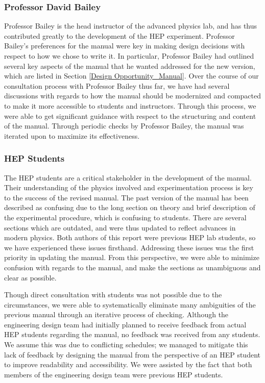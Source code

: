 \documentclass[12pt]{article} %
\begin{document}
\subsubsection{Professor David Bailey}
Professor Bailey is the head instructor of the advanced physics lab, and has thus contributed greatly to the development of the HEP experiment. Professor Bailey's preferences for the manual were key in making design decisions with respect to how we chose to write it. In particular, Professor Bailey had outlined several key aspects of the manual that he wanted addressed for the new version, which are listed in Section \ref{Design Opportunity_Manual}. Over the course of our consultation process with Professor Bailey thus far, we have had several discussions with regards to how the manual should be modernized and compacted to make it more accessible to students and instructors. Through this process, we were able to get significant guidance with respect to the structuring and content of the manual. Through periodic checks by Professor Bailey, the manual was iterated upon to maximize its effectiveness.

\subsubsection{HEP Students}
The HEP students are a critical stakeholder in the development of the manual. Their understanding of the physics involved and experimentation process is key to the success of the revised manual. The past version of the manual has been described as confusing due to the long section on theory and brief description of the experimental procedure, which is confusing to students. There are several sections which are outdated, and were thus updated to reflect advances in modern physics. Both authors of this report were previous HEP lab students, so we have experienced these issues firsthand. Addressing these issues was the first priority in updating the manual. From this perspective, we were able to minimize confusion with regards to the manual, and make the sections as unambiguous and clear as possible. 

Though direct consultation with students was not possible due to the circumstances, we were able to systematically eliminate many ambiguities of the previous manual through an iterative process of checking. Although the engineering design team had initially planned to receive feedback from actual HEP students regarding the manual, no feedback was received from any students. We assume this was due to conflicting schedules; we managed to mitigate this lack of feedback by designing the manual from the perspective of an HEP student to improve readability and accessibility. We were assisted by the fact that both members of the engineering design team were previous HEP students.
\end{document}
